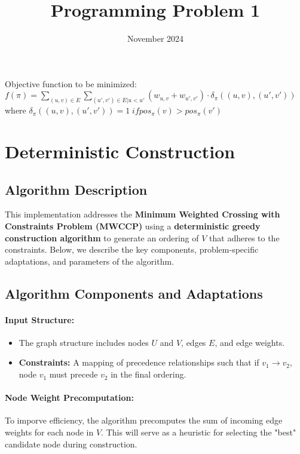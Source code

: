 \documentclass{article}
\title{Programming Problem 1}
\author{}
\date{November 2024}
\begin{document}
\maketitle

Objective function to be minimized:
\( f (\pi) = \sum_{(u, v) \in E} \sum_{(u', v') \in E | u< u'} (w_{u,v}+w_{u', v'}) \cdot \delta_{\pi}((u, v), (u', v') )\)
where 
\(\delta_{\pi}((u, v), (u', v') ) = 1 \; if pos_{\pi}(v) > pos_{\pi}(v') \)

\section*{Deterministic Construction}

\subsection*{Algorithm Description}

This implementation addresses the \textbf{Minimum Weighted Crossing with Constraints Problem (MWCCP)} using a \textbf{deterministic greedy construction algorithm} to generate an ordering of \( V \) that adheres to the constraints. Below, we describe the key components, problem-specific adaptations, and parameters of the algorithm.


\subsection*{Algorithm Components and Adaptations}

\paragraph{Input Structure:}
\begin{itemize}
    \item The graph structure includes nodes \( U \) and \( V \), edges \( E \), and edge weights.
    \item \textbf{Constraints:} A mapping of precedence relationships such that if \( v_1 \to v_2 \), node \( v_1 \) must precede \( v_2 \) in the final ordering.
\end{itemize}

\paragraph{Node Weight Precomputation:}
To imporve efficiency, the algorithm precomputes the sum of incoming edge weights for each node in \( V \). This will serve as a heuristic for selecting the "best" candidate node during construction.
\end{document}
